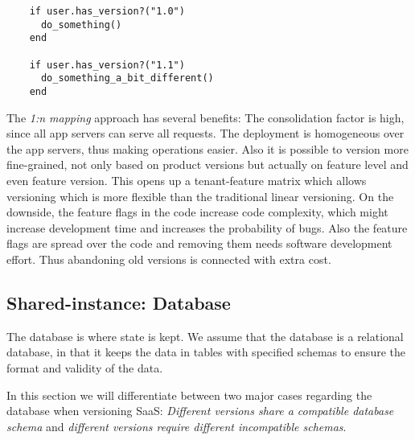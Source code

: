 \noindent\begin{minipage}{\textwidth}
  \begin{lstlisting}
    if user.has_version?("1.0")
      do_something()
    end

    if user.has_version?("1.1")
      do_something_a_bit_different()
    end
  \end{lstlisting}
\end{minipage}

The \emph{1:n mapping} approach has several benefits: The consolidation factor is high, since all app servers can serve all requests. The deployment is homogeneous over the app servers, thus making operations easier. Also it is possible to version more fine-grained, not only based on product versions but actually on feature level and even feature version. This opens up a tenant-feature matrix which allows versioning which is more flexible than the traditional linear versioning.
On the downside, the feature flags in the code increase code complexity, which might increase development time and increases the probability of bugs. Also the feature flags are spread over the code and removing them needs software development effort. Thus abandoning old versions is connected with extra cost.

%
%
%

\subsection{Shared-instance: Database}
\label{sec:database}

The database is where state is kept. We assume that the database is a relational database, in that it keeps the data in tables with specified schemas to ensure the format and validity of the data.

In this section we will differentiate between two major cases regarding the database when versioning SaaS: \emph{Different versions share a compatible database schema} and \emph{different versions require different incompatible schemas}.

